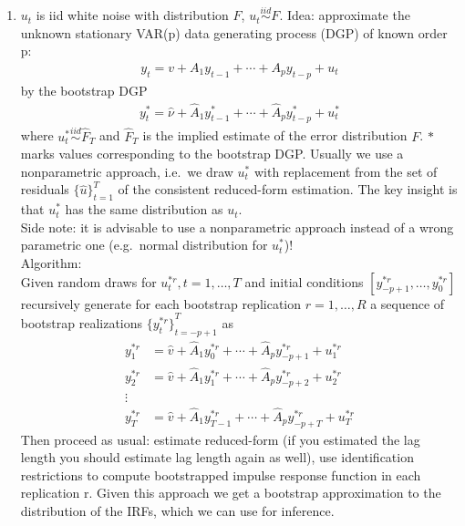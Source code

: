 \begin{enumerate}
\item \(u_t\) is iid white noise with distribution \(F\), \(u_t \overset{iid}{\sim} F\).
Idea: approximate the unknown stationary VAR(p) data generating process (DGP) of known order p:
\begin{align*}
y_t = v + A_1 y_{t-1} + \cdots  + A_p y_{t-p} + u_t
\end{align*}
by the bootstrap DGP
\begin{align*}
y_t^\ast = \hat{\nu} + \hat{A}_1 y_{t-1}^\ast + \cdots  + \hat{A}_p y_{t-p}^\ast + u_t^\ast
\end{align*}
where \(u_t^\ast \overset{iid}{\sim} \hat{F}_T\) and \(\hat{F}_T\) is the implied estimate of the error distribution \(F\).
\(\ast \) marks values corresponding to the bootstrap DGP\@.
Usually we use a nonparametric approach,
  i.e.\ we draw \(u_t^\ast \) with replacement from the set of residuals \( {\{\hat{u}\}}_{t=1}^T\) of the consistent reduced-form estimation.
The key insight is that \(u_t^\ast \) has the same distribution as \(u_t\). 
\\
Side note: it is advisable to use a nonparametric approach instead of a wrong parametric one (e.g.\ normal distribution for \(u_t^\ast \))!
\\
Algorithm:
\\
Given random draws for \(u_t^{\ast r}, t=1,\ldots ,T\) and initial conditions \([y_{-p+1}^{\ast r}, \ldots  ,y_0^{\ast r}]\)
  recursively generate for each bootstrap replication \(r=1,\ldots ,R\) a sequence of bootstrap realizations \( {\{y_t^{\ast r}\}}_{t=-p+1}^T\) as
\begin{align*}
    y_1^{\ast r} &= \hat{v} + \hat{A}_1 y_0^{\ast r} + \cdots  + \hat{A}_p y_{-p+1}^{\ast r} + u_1^{\ast r}\\
    y_2^{\ast r} &= \hat{v} + \hat{A}_1 y_1^{\ast r} + \cdots  + \hat{A}_p y_{-p+2}^{\ast r} + u_2^{\ast r}\\
    \vdots &\\
    y_T^{\ast r} &= \hat{v} + \hat{A}_1 y_{T-1}^{\ast r} + \cdots  + \hat{A}_p y_{-p+T}^{\ast r} + u_T^{\ast r}
\end{align*}
Then proceed as usual: estimate reduced-form (if you estimated the lag length you should estimate lag length again as well),
  use identification restrictions to compute bootstrapped impulse response function in each replication r.
Given this approach we get a bootstrap approximation to the distribution of the IRFs, which we can use for inference.


\end{enumerate}
